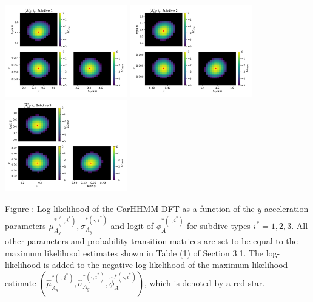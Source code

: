 \documentclass{article}
\begin{document}
        
        \begin{center}
        \includegraphics[width=2.1in]{../Plots/2019/20190902-182840-CATs_OB_1_0_267_CarHHMM2_fine-theta-likelihood-Ay-0.png}
        \includegraphics[width=2.1in]{../Plots/2019/20190902-182840-CATs_OB_1_0_267_CarHHMM2_fine-theta-likelihood-Ay-1.png}
        \includegraphics[width=2.1in]{../Plots/2019/20190902-182840-CATs_OB_1_0_267_CarHHMM2_fine-theta-likelihood-Ay-2.png}
        \end{center}
        
        \noindent Figure : Log-likelihood of the CarHHMM-DFT as a function of the $y$-acceleration parameters $\mu_{A_y}^{*(\cdot,i^*)}, \sigma_{A_y}^{*(\cdot,i^*)}$ and logit of $\phi_{A}^{*(\cdot,i^*)}$ for subdive types $i^* = 1,2,3$. All other parameters and probability transition matrices are set to be equal to the maximum likelihood estimates shown in Table (1) of Section 3.1. The log-likelihood is added to the negative log-likelihood of the maximum likelihood estimate $(\hat \mu_{A_y}^{*(\cdot,i^*)}, \hat \sigma_{A_y}^{*(\cdot,i^*)}, \hat \phi_{A}^{*(\cdot,i^*)})$, which is denoted by a red star.
        \addtocounter{fignum}{1}
        
\end{document}
